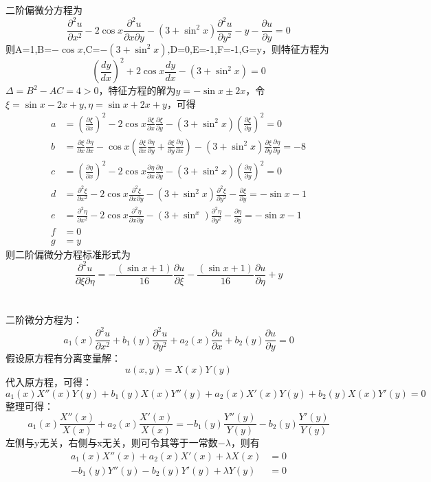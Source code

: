 \documentclass[10.5pt]{article}
\begin{document}
\subsection{}
二阶偏微分方程为$$\frac{\partial^2u}{\partial x^2}-2\cos x\frac{\partial^2u}{\partial x\partial y}-(3+\sin^2x)\frac{\partial^2u}{\partial y^2}-y-\frac{\partial u}{\partial y}=0$$\indent
则A=1,B=$-\cos x$,C=$-(3+\sin^2x)$,D=0,E=-1,F=-1,G=y，则特征方程为$$\left(\frac{dy}{dx}\right)^2+2\cos x\frac{dy}{dx}-(3+\sin^2x)=0$$\indent
$\Delta=B^2-AC=4>0$，特征方程的解为$y=-\sin x\pm 2x$，令$\xi=\sin x-2x+y,\eta=\sin x+2x+y$，可得$$\begin{aligned}
    a&=\left(\frac{\partial\xi}{\partial x}\right)^2-2\cos x\frac{\partial\xi}{\partial x}\frac{\partial\xi}{\partial y}-(3+\sin^2x)\left(\frac{\partial\xi}{\partial y}\right)^2=0\\
    b&=\frac{\partial\xi}{\partial x}\frac{\partial\eta}{\partial x}-\cos x\left(\frac{\partial\xi}{\partial x}\frac{\partial\eta}{\partial y}+\frac{\partial\xi}{\partial y}\frac{\partial\eta}{\partial x}\right)-(3+\sin^2x)\frac{\partial\xi}{\partial y}\frac{\partial\eta}{\partial y}=-8\\
    c&=\left(\frac{\partial\eta}{\partial x}\right)^2-2\cos x\frac{\partial\eta}{\partial x}\frac{\partial\eta}{\partial y}-(3+\sin^2x)\left(\frac{\partial\eta}{\partial y}\right)^2=0\\
    d&=\frac{\partial^2\xi}{\partial x^2}-2\cos x\frac{\partial^2\xi}{\partial x\partial y}-(3+\sin^2x)\frac{\partial^2\xi}{\partial y^2}-\frac{\partial\xi}{\partial y}=-\sin x-1\\
    e&=\frac{\partial^2\eta}{\partial x^2}-2\cos x\frac{\partial^2\eta}{\partial x\partial y}-(3+\sin^x)\frac{\partial^2\eta}{\partial y^2}-\frac{\partial\eta}{\partial y}=-\sin x-1\\
    f&=0\\
    g&=y
\end{aligned}$$\indent
则二阶偏微分方程标准形式为$$\frac{\partial^2u}{\partial\xi\partial\eta}=-\frac{(\sin x+1)}{16}\frac{\partial u}{\partial\xi}-\frac{(\sin x+1)}{16}\frac{\partial u}{\partial\eta}+y$$

\section{}
\subsection{}
二阶微分方程为：$$a_1(x)\frac{\partial^2u}{\partial x^2}+b_1(y)\frac{\partial^2u}{\partial y^2}+a_2(x)\frac{\partial u}{\partial x}+b_2(y)\frac{\partial u}{\partial y}=0$$\indent
假设原方程有分离变量解：$$u(x,y)=X(x)Y(y)$$\indent
代入原方程，可得：$$a_1(x)X''(x)Y(y)+b_1(y)X(x)Y''(y)+a_2(x)X'(x)Y(y)+b_2(y)X(x)Y'(y)=0$$\indent
整理可得：$$a_1(x)\frac{X''(x)}{X(x)}+a_2(x)\frac{X'(x)}{X(x)}=-b_1(y)\frac{Y''(y)}{Y(y)}-b_2(y)\frac{Y'(y)}{Y(y)}$$\indent
左侧与y无关，右侧与x无关，则可令其等于一常数$-\lambda$，则有$$\begin{aligned}
    a_1(x)X''(x)+a_2(x)X'(x)+\lambda X(x)&=0\\
    -b_1(y)Y''(y)-b_2(y)Y'(y)+\lambda Y(y)&=0
\end{aligned}$$
\end{document}
